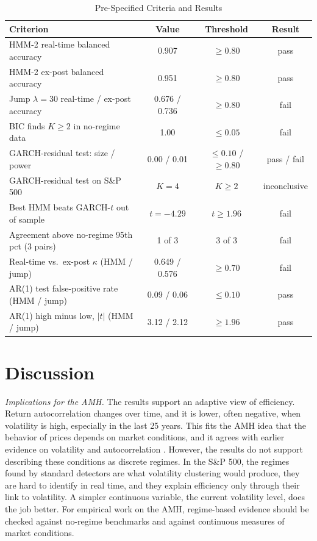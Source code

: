 \documentclass[conference]{IEEEtran}
\begin{document}
\begin{table}[t]
\centering
\caption{Pre-Specified Criteria and Results}
\label{tab:score}
\footnotesize
\setlength{\tabcolsep}{2.5pt}
\begin{tabular}{p{6.2cm}ccc}
\toprule
Criterion & Value & Threshold & Result \\
\midrule
HMM-2 real-time balanced accuracy & 0.907 & $\ge 0.80$ & pass \\
HMM-2 ex-post balanced accuracy & 0.951 & $\ge 0.80$ & pass \\
Jump $\lambda{=}30$ real-time / ex-post accuracy & 0.676 / 0.736 & $\ge 0.80$ & fail \\
BIC finds $K{\ge}2$ in no-regime data & 1.00 & $\le 0.05$ & fail \\
GARCH-residual test: size / power & 0.00 / 0.01 & $\le 0.10$ / $\ge 0.80$ & pass / fail \\
GARCH-residual test on S\&P 500 & $K = 4$ & $K \ge 2$ & inconclusive \\
Best HMM beats GARCH-$t$ out of sample & $t = -4.29$ & $t \ge 1.96$ & fail \\
Agreement above no-regime 95th pct (3 pairs) & 1 of 3 & 3 of 3 & fail \\
Real-time vs.\ ex-post $\kappa$ (HMM / jump) & 0.649 / 0.576 & $\ge 0.70$ & fail \\
AR(1) test false-positive rate (HMM / jump) & 0.09 / 0.06 & $\le 0.10$ & pass \\
AR(1) high minus low, $|t|$ (HMM / jump) & 3.12 / 2.12 & $\ge 1.96$ & pass \\
\bottomrule
\end{tabular}
\end{table}

\section{Discussion}

\emph{Implications for the AMH.} The results support an adaptive view of efficiency. Return autocorrelation changes over time, and it is lower, often negative, when volatility is high, especially in the last 25 years. This fits the AMH idea that the behavior of prices depends on market conditions, and it agrees with earlier evidence on volatility and autocorrelation \cite{lebaron1992, sentana1992}. However, the results do not support describing these conditions as discrete regimes. In the S\&P 500, the regimes found by standard detectors are what volatility clustering would produce, they are hard to identify in real time, and they explain efficiency only through their link to volatility. A simpler continuous variable, the current volatility level, does the job better. For empirical work on the AMH, regime-based evidence should be checked against no-regime benchmarks and against continuous measures of market conditions.
\end{document}
